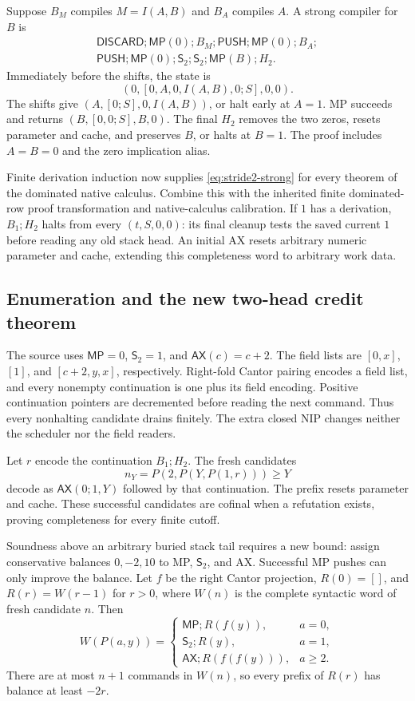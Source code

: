 Suppose $B_M$ compiles $M=I(A,B)$ and $B_A$ compiles $A$. A strong
compiler for $B$ is
\begin{equation}
 \begin{split}
 \mathsf{DISCARD};\mathsf{MP}(0);B_M;
 \mathsf{PUSH};\mathsf{MP}(0);B_A;\\
 \mathsf{PUSH};\mathsf{MP}(0);
 \mathsf S_2;\mathsf S_2;\mathsf{MP}(B);H_2.
 \end{split}
 \label{eq:stride2-mp}
\end{equation}
Immediately before the shifts, the state is
\[
 (0,[0,A,0,I(A,B),0;S],0,0).
\]
The shifts give $(A,[0;S],0,I(A,B))$, or halt early at $A=1$.
MP succeeds and returns $(B,[0,0;S],B,0)$. The final $H_2$ removes the
two zeros, resets parameter and cache, and preserves $B$, or halts at
$B=1$. The proof includes $A=B=0$ and the zero implication alias.

Finite derivation induction now supplies \eqref{eq:stride2-strong} for
every theorem of the dominated native calculus. Combine this with the
inherited finite dominated-row proof transformation and native-calculus
calibration. If $1$ has a derivation, $B_1;H_2$ halts from every
$(t,S,0,0)$: its final cleanup tests the saved current $1$ before reading
any old stack head. An initial AX resets arbitrary numeric parameter and
cache, extending this completeness word to arbitrary work data.

\subsection{Enumeration and the new two-head credit theorem}

The source uses $\mathsf{MP}=0$, $\mathsf S_2=1$, and
$\mathsf{AX}(c)=c+2$. The field lists are $[0,x]$, $[1]$, and
$[c+2,y,x]$, respectively. Right-fold Cantor pairing encodes a field
list, and every nonempty continuation is one plus its field encoding.
Positive continuation pointers are decremented before reading the next
command. Thus every nonhalting candidate drains finitely. The extra
closed NIP changes neither the scheduler nor the field readers.

Let $r$ encode the continuation $B_1;H_2$. The fresh candidates
\[
 n_Y=P(2,P(Y,P(1,r)))\geq Y
\]
decode as $\mathsf{AX}(0;1,Y)$ followed by that continuation. The prefix
resets parameter and cache. These successful candidates are cofinal when
a refutation exists, proving completeness for every finite cutoff.

Soundness above an arbitrary buried stack tail requires a new bound:
assign conservative balances $0,-2,10$ to MP, $\mathsf S_2$, and AX.
Successful MP pushes can only improve the balance. Let $f$ be the right
Cantor projection, $R(0)=[]$, and $R(r)=W(r-1)$ for $r>0$, where $W(n)$
is the complete syntactic word of fresh candidate $n$. Then
\[
 W(P(a,y))=
 \begin{cases}
  \mathsf{MP};R(f(y)),&a=0,\\
  \mathsf S_2;R(y),&a=1,\\
  \mathsf{AX};R(f(f(y))),&a\geq2.
 \end{cases}
\]
There are at most $n+1$ commands in $W(n)$, so every prefix of $R(r)$
has balance at least $-2r$.

